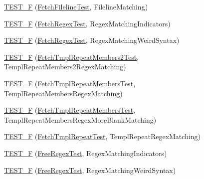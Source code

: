 \begin{DoxyCompactItemize}
\item 
\hyperlink{namespaceclang_1_1tidy_1_1pagesjaunes_1_1test_a10fd631fb59f61de469bea299040db9e}{T\+E\+S\+T\+\_\+F} (\hyperlink{classclang_1_1tidy_1_1pagesjaunes_1_1test_1_1_fetch_fileline_test}{Fetch\+Fileline\+Test}, Fileline\+Matching)
\item 
\hyperlink{namespaceclang_1_1tidy_1_1pagesjaunes_1_1test_af73c5ad3ee3e0701c44689229929623e}{T\+E\+S\+T\+\_\+F} (\hyperlink{classclang_1_1tidy_1_1pagesjaunes_1_1test_1_1_fetch_regex_test}{Fetch\+Regex\+Test}, Regex\+Matching\+Indicators)
\item 
\hyperlink{namespaceclang_1_1tidy_1_1pagesjaunes_1_1test_aaaab9c2cf0aacb3b6638ee3b02fcb33e}{T\+E\+S\+T\+\_\+F} (\hyperlink{classclang_1_1tidy_1_1pagesjaunes_1_1test_1_1_fetch_regex_test}{Fetch\+Regex\+Test}, Regex\+Matching\+Weird\+Syntax)
\item 
\hyperlink{namespaceclang_1_1tidy_1_1pagesjaunes_1_1test_a4cddde8142a52210e1a4a2b2d6245319}{T\+E\+S\+T\+\_\+F} (\hyperlink{classclang_1_1tidy_1_1pagesjaunes_1_1test_1_1_fetch_tmpl_repeat_members2_test}{Fetch\+Tmpl\+Repeat\+Members2\+Test}, Templ\+Repeat\+Members2\+Regex\+Matching)
\item 
\hyperlink{namespaceclang_1_1tidy_1_1pagesjaunes_1_1test_a68dff4d1bdbff04447e8cc4668b2c01f}{T\+E\+S\+T\+\_\+F} (\hyperlink{classclang_1_1tidy_1_1pagesjaunes_1_1test_1_1_fetch_tmpl_repeat_members_test}{Fetch\+Tmpl\+Repeat\+Members\+Test}, Templ\+Repeat\+Members\+Regex\+Matching)
\item 
\hyperlink{namespaceclang_1_1tidy_1_1pagesjaunes_1_1test_abf1aca281ebebf3e7b6dec0e2dd308d1}{T\+E\+S\+T\+\_\+F} (\hyperlink{classclang_1_1tidy_1_1pagesjaunes_1_1test_1_1_fetch_tmpl_repeat_members_test}{Fetch\+Tmpl\+Repeat\+Members\+Test}, Templ\+Repeat\+Members\+Regex\+More\+Blank\+Matching)
\item 
\hyperlink{namespaceclang_1_1tidy_1_1pagesjaunes_1_1test_ae224f8294c705315456c4a87a2a71a84}{T\+E\+S\+T\+\_\+F} (\hyperlink{classclang_1_1tidy_1_1pagesjaunes_1_1test_1_1_fetch_tmpl_repeat_test}{Fetch\+Tmpl\+Repeat\+Test}, Templ\+Repeat\+Regex\+Matching)
\item 
\hyperlink{namespaceclang_1_1tidy_1_1pagesjaunes_1_1test_a8fbe104b8e3e27f949ce5b93f523dd05}{T\+E\+S\+T\+\_\+F} (\hyperlink{classclang_1_1tidy_1_1pagesjaunes_1_1test_1_1_free_regex_test}{Free\+Regex\+Test}, Regex\+Matching\+Indicators)
\item 
\hyperlink{namespaceclang_1_1tidy_1_1pagesjaunes_1_1test_a34c90a906bf999b3505c0b11192c6294}{T\+E\+S\+T\+\_\+F} (\hyperlink{classclang_1_1tidy_1_1pagesjaunes_1_1test_1_1_free_regex_test}{Free\+Regex\+Test}, Regex\+Matching\+Weird\+Syntax)

\end{DoxyCompactItemize}
